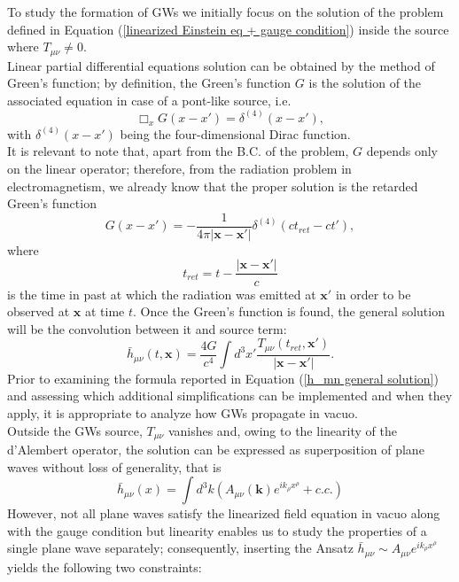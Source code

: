 To study the formation of GWs we initially focus on the solution of the problem defined in Equation (\ref{linearized Einstein eq + gauge condition}) inside the source where $T_{\mu\nu}\ne 0$.\\Linear partial differential equations solution can be obtained by the method of Green's function; by definition, the Green's function $G$ is the solution of the associated equation in case of a pont-like source, i.e.
\begin{equation}\label{Green equation}
    \Box_x G(x-x') = \delta^{(4)}(x-x'),
\end{equation}
with $\delta^{(4)}(x-x')$ being the four-dimensional Dirac function.\\It is relevant to note that, apart from the B.C. of the problem, $G$ depends only on the linear operator; therefore, from the radiation problem in electromagnetism, we already know that the proper solution is the retarded Green's function 
\begin{equation}\label{retarded Green function}
    G(x-x')=-\frac{1}{4\pi |\mathbf{x}-\mathbf{x'}|}\delta^{(4)}(ct_{ret}-ct'),
\end{equation}
where 
\begin{equation}\label{retarded time def}
    t_{ret}=t-\frac{|\mathbf{x}-\mathbf{x'}|}{c}
\end{equation}
is the time in past at which the radiation was emitted at $\mathbf{x'}$ in order to be observed at $\mathbf{x}$ at time $t$. Once the Green's function is found, the general solution will be the convolution between it and source term:
\begin{equation}\label{h_mn general solution}
    \bar{h}_{\mu\nu}(t,\mathbf{x})=\frac{4G}{c^4}\int d^3x'\frac{T_{\mu\nu}(t_{ret},\mathbf{x'})}{|\mathbf{x}-\mathbf{x'}|}.
\end{equation}
Prior to examining the formula reported in Equation (\ref{h_mn general solution}) and assessing which additional simplifications can be implemented and when they apply, it is appropriate to analyze how GWs propagate in vacuo.\\Outside the GWs source, $T_{\mu\nu}$ vanishes and, owing to the linearity of the d’Alembert operator, the solution can be expressed as superposition of plane waves without loss of generality, that is
\begin{equation}
    \bar{h}_{\mu\nu}(x)=\int d^3k (A_{\mu\nu}(\mathbf{k})e^{ik_\rho x^\rho}+c.c.)
\end{equation}
However, not all plane waves satisfy the linearized field equation in vacuo along with the gauge condition but linearity enables us to study the properties of a single plane wave separately; consequently, inserting the Ansatz $\bar{h}_{\mu\nu}\sim A_{\mu\nu}e^{ik_\rho x^\rho}$ yields the following two constraints:
